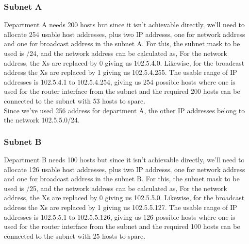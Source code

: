 \documentclass{home_assignment}
\begin{document}
\subsubsection*{Subnet A}
Department A needs 200 hosts but since it isn't achievable directly, we'll need to allocate 254 usable host addresses, plus two IP addresss, one for network address and one for broadcast address in the subnet A.
For this, the subnet mask to be used is /24, and the network address can be calculated as,
For the network address, the Xs are replaced by 0 giving us 102.5.4.0. Likewise, for the broadcast address the Xs are replaced by 1 giving us 102.5.4.255. The usable range of IP addresses is 102.5.4.1 to 102.5.4.254, giving us 254 possible hosts where one is used for the router interface from the subnet and the required 200 hosts can be connected to the subnet with 53 hosts to spare.
\\
Since we've used 256 address for department A, the other IP addresses belong to the network 102.5.5.0/24. 
\subsubsection*{Subnet B}
Department B needs 100 hosts but since it isn't achievable directly, we'll need to allocate 126 usable host addresses, plus two IP addresss, one for network address and one for broadcast address in the subnet B.
For this, the subnet mask to be used is /25, and the network address can be calculated as,
For the network address, the Xs are replaced by 0 giving us 102.5.5.0. Likewise, for the broadcast address the Xs are replaced by 1 giving us 102.5.5.127. The usable range of IP addresses is 102.5.5.1 to 102.5.5.126, giving us 126 possible hosts where one is used for the router interface from the subnet and the required 100 hosts can be connected to the subnet with 25 hosts to spare.
\end{document}
